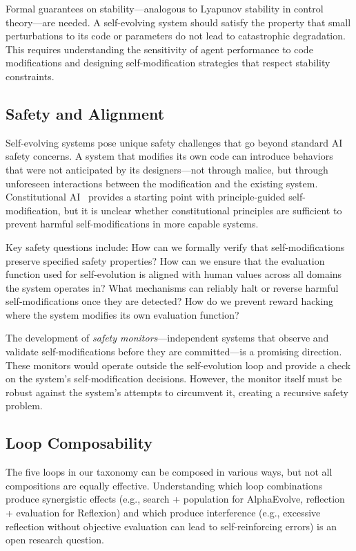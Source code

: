 \documentclass[11pt,a4paper]{article}
\begin{document}
Formal guarantees on stability---analogous to Lyapunov stability in control theory---are needed. A self-evolving system should satisfy the property that small perturbations to its code or parameters do not lead to catastrophic degradation. This requires understanding the sensitivity of agent performance to code modifications and designing self-modification strategies that respect stability constraints.

\subsection{Safety and Alignment}

Self-evolving systems pose unique safety challenges that go beyond standard AI safety concerns. A system that modifies its own code can introduce behaviors that were not anticipated by its designers---not through malice, but through unforeseen interactions between the modification and the existing system. Constitutional AI~\citep{bai2022constitutional} provides a starting point with principle-guided self-modification, but it is unclear whether constitutional principles are sufficient to prevent harmful self-modifications in more capable systems.

Key safety questions include: How can we formally verify that self-modifications preserve specified safety properties? How can we ensure that the evaluation function used for self-evolution is aligned with human values across all domains the system operates in? What mechanisms can reliably halt or reverse harmful self-modifications once they are detected? How do we prevent reward hacking where the system modifies its own evaluation function?

The development of \emph{safety monitors}---independent systems that observe and validate self-modifications before they are committed---is a promising direction. These monitors would operate outside the self-evolution loop and provide a check on the system's self-modification decisions. However, the monitor itself must be robust against the system's attempts to circumvent it, creating a recursive safety problem.

\subsection{Loop Composability}

The five loops in our taxonomy can be composed in various ways, but not all compositions are equally effective. Understanding which loop combinations produce synergistic effects (e.g., search + population for AlphaEvolve, reflection + evaluation for Reflexion) and which produce interference (e.g., excessive reflection without objective evaluation can lead to self-reinforcing errors) is an open research question.
\end{document}
